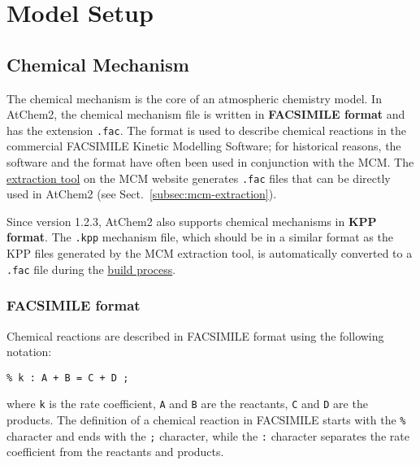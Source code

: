 %
%
%
%

\chapter{Model Setup} \label{ch:setup}

\section{Chemical Mechanism} \label{sec:chemical-mechanism}

The chemical mechanism is the core of an atmospheric chemistry
model. In AtChem2, the chemical mechanism file is written in
\textbf{FACSIMILE format} and has the extension \texttt{.fac}. The
format is used to describe chemical reactions in the commercial
FACSIMILE Kinetic Modelling Software; for historical reasons, the
software and the format have often been used in conjunction with the
MCM. The \href{https://mcm.york.ac.uk/MCM/export}{extraction tool} on
the MCM website generates \texttt{.fac} files that can be directly
used in AtChem2 (see Sect.~\ref{subsec:mcm-extraction}).

Since version 1.2.3, AtChem2 also supports chemical mechanisms in
\textbf{KPP format}. The \texttt{.kpp} mechanism file, which should be
in a similar format as the KPP files generated by the MCM extraction
tool, is automatically converted to a \texttt{.fac} file during the
\hyperref[subsec:build-process]{build process}.

\subsection{FACSIMILE format} \label{subsec:facsimile-format}

Chemical reactions are described in FACSIMILE format using the
following notation:

\begin{verbatim}
% k : A + B = C + D ;
\end{verbatim}

where \texttt{k} is the rate coefficient, \texttt{A} and \texttt{B}
are the reactants, \texttt{C} and \texttt{D} are the products. The
definition of a chemical reaction in FACSIMILE starts with the
\texttt{\%} character and ends with the \texttt{;} character, while
the \texttt{:} character separates the rate coefficient from the
reactants and products.

